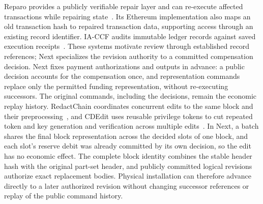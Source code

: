 Reparo provides a publicly verifiable repair layer and can re-execute affected
transactions while repairing state~\cite{reparo}. Its Ethereum implementation also maps an old transaction hash to
repaired transaction data, supporting access through an existing record
identifier. IA-CCF audits immutable ledger records against saved execution
receipts~\cite{ia-ccf}. These systems motivate review through established
record references; Next specializes the revision authority to a committed
compensation decision. Next fixes payment
authorizations and outputs in advance: a public decision accounts for the
compensation once, and representation commands replace only the permitted
funding representation, without re-executing successors. The original
commands, including the decisions, remain the economic replay history.
RedactChain coordinates concurrent edits to the same block and their
preprocessing~\cite{redactchain}, and CDEdit uses reusable privilege tokens to
cut repeated token and key generation and verification across multiple
edits~\cite{cdedit}. In Next, a batch shares the final block representation
across the decided slots of one block, and each slot's reserve debit was
already committed by its own decision, so the edit has no economic effect. The
complete block identity combines the stable header hash with the original
part-set header, and publicly committed logical revisions authorize exact
replacement bodies. Physical installation can therefore advance directly to a
later authorized revision without changing successor references or replay of
the public command history.
